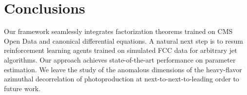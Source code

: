 \section{Conclusions}\label{sec:conclusions}

Our framework seamlessly integrates factorization theorems trained on
CMS Open Data and canonical differential equations. A natural next step
is to resum reinforcement learning agents trained on simulated FCC data
for arbitrary jet algorithms. Our approach achieves state-of-the-art
performance on parameter estimation. We leave the study of the anomalous
dimensions of the heavy-flavor azimuthal decorrelation of
photoproduction at next-to-next-to-leading order to future work.

